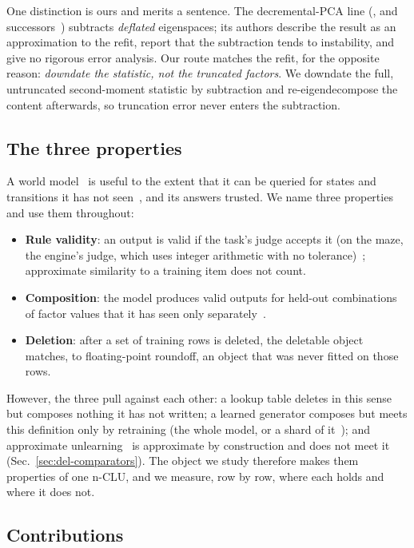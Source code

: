 \documentclass{article} %
\begin{document}
One distinction is ours and merits a sentence. The decremental-PCA
line (\citealp{hall_adding_2002}, and successors~\citep{jin_evd_2014,lee_fast_2021}) subtracts \emph{deflated} eigenspaces;
its authors describe the result as an approximation to the refit, report that the subtraction
tends to instability, and give no rigorous error analysis. Our route matches the refit, for the opposite reason: \emph{downdate the statistic, not the truncated factors}. We downdate the full,
untruncated second-moment statistic by subtraction and re-eigendecompose the content
afterwards, so truncation error never enters the subtraction.

\subsection{The three properties}
\label{sec:why}

A world model~\citep{ha_world_2018,hafner_mastering_2025} is useful to the extent that it can be queried for states and transitions it has
not seen~\citep{valevski_diffusion_2025}, and its answers trusted. We name three properties and use them throughout:
\begin{itemize}
\item \textbf{Rule validity}: an output is valid if the task's judge accepts it (on the maze, the engine's judge, which
uses integer arithmetic with no tolerance)~\citep{vafa_evaluating_2024}; approximate similarity to a training item does not count.
\item \textbf{Composition}: the model produces valid outputs for held-out combinations of
  factor values that it has seen only separately~\citep{zhao_toward_2022}.
\item \textbf{Deletion}: after a set of training rows
is deleted, the deletable object matches, to floating-point roundoff, an object that was never fitted
on those rows.
\end{itemize}
However, the three pull against each other: a lookup table deletes in this sense but
composes nothing it has not written; a learned generator composes but meets this definition only by
retraining (the whole model, or a shard of it~\citep{bourtoule_machine_2021}); and approximate unlearning~\citep{guo_certified_2023,golatkar_eternal_2020} is approximate by construction and does not meet it (Sec.~\ref{sec:del-comparators}). The object we study therefore makes them properties of one n-CLU, and we measure, row by row, where each holds and where it does not.

\subsection{Contributions}
\label{sec:contrib}
\end{document}
